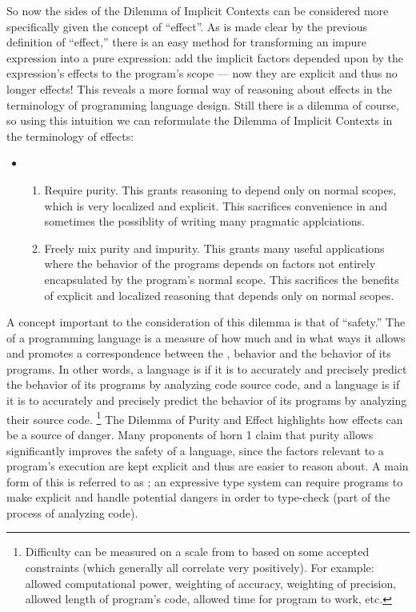 So now the sides of the Dilemma of Implicit Contexts can be considered more specifically given the concept of ``effect''.
As is made clear by the previous definition of ``effect,'' there is an easy method for transforming an impure expression into a pure expression: add the implicit factors depended upon by the expression's effects to the program's scope --- now they are explicit and thus no longer effects!
This reveals a more formal way of reasoning about effects in the terminology of programming language design.
Still there is a dilemma of course, so using this intuition we can reformulate the Dilemma of Implicit Contexts in the terminology of effects:

\begin{itemize}
\item[] 
\begin{enumerate}
  \item[(1)]
  Require purity.
  This grants reasoning to depend only on normal scopes, which is very localized and explicit.
  This sacrifices convenience in and sometimes the possiblity of writing many pragmatic applciations.

  \item[(2)]
  Freely mix purity and impurity.
  This grants many useful applications where the behavior of the programs depends on factors not entirely encapsulated by the program's normal scope.
  This sacrifices the benefits of explicit and localized reasoning that depends only on normal scopes.
\end{enumerate}
\end{itemize}

A concept important to the consideration of this dilemma is that of ``safety.''
The  of a programming language is a measure of how much and in what  ways it allows and promotes a correspondence between the ,  behavior and the  behavior of its programs.
In other words,
a language is  if it is  to accurately and precisely predict the behavior of its programs by analyzing code source code, and
a language is  if it is  to accurately and precisely predict the behavior of its programs by analyzing their source code.%
\footnote{
  Difficulty can be measured on a scale from  to  based on some accepted constraints (which generally all correlate very positively).
  For example: allowed computational power, weighting of accuracy, weighting of precision, allowed length of program's code, allowed time for program to work, etc.
}
The Dilemma of Purity and Effect highlights how effects can be a source of danger.
Many proponents of horn 1 claim that purity allows significantly improves the safety of a language, since the factors relevant to a program's execution are kept explicit and thus are easier to reason about.
A main form of this is referred to as ;
an expressive type system can require programs to make explicit and handle potential dangers in order to type-check (part of the process of analyzing code).

